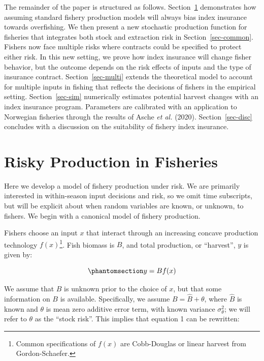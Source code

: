 \documentclass[
  letterpaper,
  DIV=11,
  numbers=noendperiod]{scrartcl}
\theoremstyle{plain}
\theoremstyle{plain}
\theoremstyle{remark}
\begin{document}
The remainder of the paper is structured as follows.
Section~\ref{sec-jp} demonstrates how assuming standard fishery
production models will always bias index insurance towards overfishing.
We then present a new stochastic production function for fisheries that
integrates both stock and extraction risk in Section~\ref{sec-common}.
Fishers now face multiple risks where contracts could be specified to
protect either risk. In this new setting, we prove how index insurance
will change fisher behavior, but the outcome depends on the risk effects
of inputs and the type of insurance contract. Section~\ref{sec-multi}
extends the theoretical model to account for multiple inputs in fishing
that reflects the decisions of fishers in the empirical setting.
Section~\ref{sec-sim} numerically estimates potential harvest changes
with an index insurance program. Parameters are calibrated with an
application to Norwegian fisheries through the results of Asche \emph{et
al.} (2020). Section~\ref{sec-disc} concludes with a discussion on the
suitability of fishery index insurance.

\section{Risky Production in Fisheries}\label{sec-jp}

Here we develop a model of fishery production under risk. We are
primarily interested in within-season input decisions and risk, so we
omit time subscripts, but will be explicit about when random variables
are known, or unknown, to fishers. We begin with a canonical model of
fishery production.

Fishers choose an input \(x\) that interact through an increasing
concave production technology \(f(x)\)\footnote{Common specifications of
  \(f(x)\) are Cobb-Douglas or linear harvest from Gordon-Schaefer.}.
Fish biomass is \(B\), and total production, or ``harvest'', \(y\) is
given by:

\begin{equation}\phantomsection\label{eq-trad}{
y = Bf(x)
}\end{equation}

We assume that \(B\) is unknown prior to the choice of \(x\), but that
some information on \(B\) is available. Specifically, we assume
\(B=\hat{B}+\theta\), where \(\hat{B}\) is known and \(\theta\) is mean
zero additive error term, with known variance \(\sigma^2_\theta\); we
will refer to \(\theta\) as the ``stock risk''. This implies that
equation 1 can be rewritten:
\end{document}
